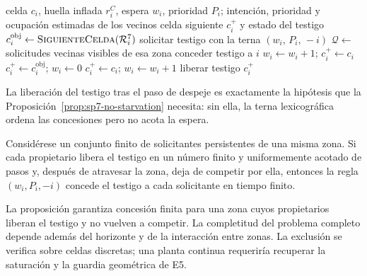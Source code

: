 \begin{algorithm}[!htbp]
\caption{Reserva vecinal y avance discreto de una coalición (E7)}
\label{alg:sp7-reserva}
\begin{algorithmic}[1]
\Require celda $c_i$, huella inflada $r_i^C$, espera $w_i$, prioridad $P_i$;
         intención, prioridad y ocupación estimadas de los vecinos
\Ensure celda siguiente $c_i^+$ y estado del testigo
\State $c_i^{\mathrm{obj}} \gets \Call{SiguienteCelda}{\mathcal R_i^7}$
  \State solicitar testigo con la terna $(w_i,\,P_i,\,-i)$
  \State $\mathcal Q \gets$ solicitudes vecinas visibles de esa zona
    \State conceder testigo a $i$
  \Else
    \State $w_i \gets w_i + 1$; \Return $c_i^+ \gets c_i$
  \EndIf
\EndIf
{}
  \State $c_i^+ \gets c_i^{\mathrm{obj}}$; $w_i \gets 0$
\Else
  \State $c_i^+ \gets c_i$; $w_i \gets w_i + 1$
\EndIf
{}
  \State liberar testigo
\EndIf
\Return $c_i^+$
\end{algorithmic}
\end{algorithm}

La liberación del testigo tras el paso de despeje es exactamente la hipótesis que
la Proposición~\ref{prop:sp7-no-starvation} necesita: sin ella, la terna
lexicográfica ordena las concesiones pero no acota la espera.

\begin{proposicion}
\label{prop:sp7-no-starvation}
Considérese un conjunto finito de solicitantes persistentes de una misma zona.
Si cada propietario libera el testigo en un número finito y uniformemente acotado
de pasos y, después de atravesar la zona, deja de competir por ella, entonces
la regla $(w_i,P_i,-i)$ concede el testigo a cada solicitante en tiempo finito.
\end{proposicion}
La proposición garantiza concesión finita para una zona cuyos propietarios liberan el testigo y no vuelven a competir. La completitud del problema completo depende además del horizonte y de la interacción entre zonas. La exclusión se verifica sobre celdas discretas; una planta continua requeriría recuperar la saturación y la guardia geométrica de E5.

